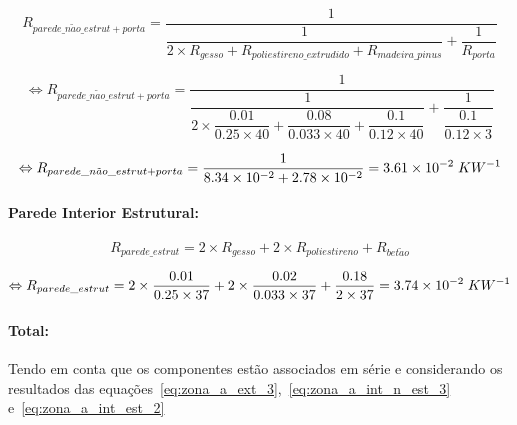 \documentclass[12pt, a4paper]{article}
\begin{document}
\begin{equation}
    R_{parede\_n\tilde{a}o\_estrut + porta} =
        \dfrac{1}{
			\dfrac{1}{
            2 \times R_{gesso} + R_{poliestireno\_extrudido} + R_{madeira\_pinus}
			}
			+
			\dfrac{1}{
				R_{porta}
			}
		}
    \label{eq:zona_a_int_n_est_1}
\end{equation}

\begin{equation}
    \Leftrightarrow R_{parede\_n\tilde{a}o\_estrut + porta} =
        \dfrac{1}{
			\dfrac{1}{
            2 \times \dfrac{0.01}{0.25 \times 40} +
            \dfrac{0.08}{0.033 \times 40} +
            \dfrac{0.1}{0.12 \times 40}
        	}
			+
			\dfrac{1}{
            \dfrac{0.1}{0.12 \times 3}
			}
		}
    \label{eq:zona_a_int_n_est_2}
\end{equation}

\begin{equation}
    \Leftrightarrow R_{parede\_n\tilde{a}o\_estrut + porta} =
	\dfrac{1}{
        8.34 \times 10^{-2} + 2.78 \times 10^{-2}
	}
	= 3.61 \times 10^{-2} \hspace{1mm} KW^{-1}
    \label{eq:zona_a_int_n_est_3}
\end{equation}

\paragraph{Parede Interior Estrutural:}\label{par:zona_a_int_est}

\begin{equation}
	R_{parede\_estrut} = 2 \times R_{gesso} + 2 \times R_{poliestireno} + R_{bet\tilde{a}o}
	\label{eq:zona_a_int_est_1}
\end{equation}

\begin{equation}
	\Leftrightarrow R_{parede\_estrut} =
		2 \times \dfrac{0.01}{0.25 \times 37} +
		2 \times \dfrac{0.02}{0.033 \times 37} +
		\dfrac{0.18}{2 \times 37}
		= 3.74 \times 10^{-2} \hspace{1mm} KW^{-1}
	\label{eq:zona_a_int_est_2}
\end{equation}


\paragraph{Total:}\label{par:zona_a_total} Tendo em conta que os componentes est\~ao
associados em série e considerando os resultados das
equa\c{c}\~oes~\ref*{eq:zona_a_ext_3},~\ref*{eq:zona_a_int_n_est_3} e~\ref*{eq:zona_a_int_est_2}
\end{document}
